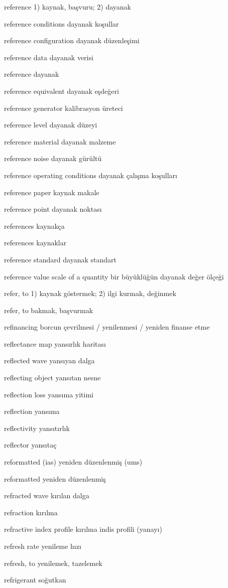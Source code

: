 \documentclass[12pt,fleqn]{article}\usepackage{../../common}
\begin{document}
reference 1) kaynak, başvuru; 2) dayanak

reference conditions dayanak koşullar

reference configuration dayanak düzenleşimi

reference data dayanak verisi

reference dayanak

reference equivalent dayanak eşdeğeri

reference generator kalibrasyon üreteci

reference level dayanak düzeyi

reference material dayanak malzeme

reference noise dayanak gürültü

reference operating conditions dayanak çalışma koşulları

reference paper kaynak makale

reference point dayanak noktası

references kaynakça

references kaynaklar

reference standard dayanak standart

reference value scale of a quantity bir büyüklüğün dayanak değer ölçeği

refer, to 1) kaynak göstermek; 2) ilgi kurmak, değinmek

refer, to bakmak, başvurmak

refinancing borcun çevrilmesi / yenilenmesi / yeniden finanse etme

reflectance map yansırlık haritası

reflected wave yansıyan dalga

reflecting object yansıtan nesne

reflection loss yansıma yitimi

reflection yansıma

reflectivity yansıtırlık

reflector yansıtaç

reformatted (ias) yeniden düzenlenmiş (ums)

reformatted yeniden düzenlenmiş

refracted wave kırılan dalga

refraction kırılma

refractive index profile kırılma indis profili (yanayı)

refresh rate yenileme hızı

refresh, to yenilemek, tazelemek

refrigerant soğutkan
\end{document}
